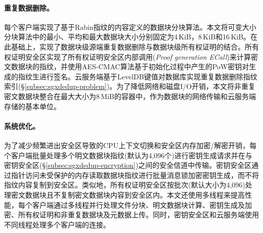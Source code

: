\paragraph*{重复数据删除。}每个客户端实现了基于Rabin指纹的内容定义的数据块分块算法。本文将可变大小分块算法中的最小、平均和最大数据块大小分别固定为4\,KiB，8\,KiB和16\,KiB。在此基础上，\sysnameS 实现了数据块级源端重复数据删除与数据块级所有权证明的结合。所有权证明安全区实现了所有权证明安全区内部调用(\textit{Proof generation ECall})来计算密文数据块的指纹，并使用AES-CMAC算法基于初始化过程中产生的PoW密钥对生成的指纹生进行签名。云服务端基于LevelDB键值对数据库实现重复数据删除指纹索引(\S\ref{subsec:sgxdedup-problem})。为了降低网络和磁盘I/O开销，本文将非重复密文数据块整合在最大大小为8\,MiB的容器中，作为数据块的网络传输和云服务端存储的基本单位。

\paragraph*{系统优化。}为了减少频繁进出安全区导致的CPU上下文切换和安全区内存加密/解密开销，每个客户端批量处理多个明文数据块指纹(默认为4,096个)进行密钥生成请求并在与密钥安全区(\S\ref{subsec:sgxdedup-encryption})之间的安全信道中传输。密钥安全区通过指针访问未受保护的内存读取数据块指纹进行批量消息锁加密密钥生成，而不将指纹内容复制到安全区。类似地，所有权证明安全区按批次(默认大小为4,096)处理密文数据块且不复制密文数据块内容到安全区内。本文还使用多线程来提高性能，每个客户端通过多线程并行处理文件分块、明文数据块计算、密钥生成及加密、所有权证明和非重复数据块及元数据上传。同时，密钥安全区和云服务端使用不同线程处理多个客户端的连接。